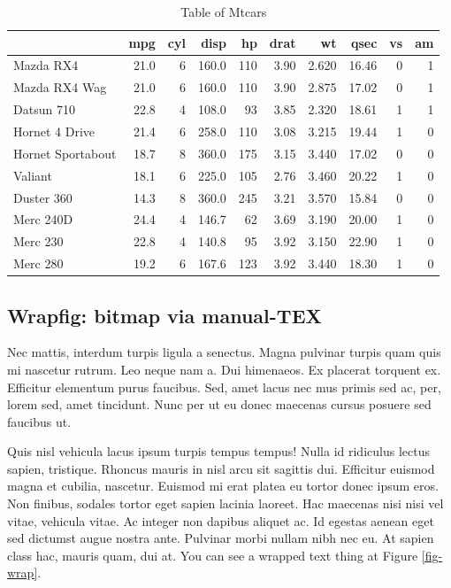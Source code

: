 \documentclass[
  9pt,
  letterpaper,
  DIV=11,
  numbers=noendperiod]{scrartcl}
\begin{document}
\hypertarget{tbl-mtcars2}{}
\begin{table}
\caption{\label{tbl-mtcars2}Table of Mtcars }\tabularnewline

\centering\begingroup\fontsize{7}{9}\selectfont

\begin{tabular}{l|r|r|r|r|r|r|r|r|r}
\hline
  & mpg & cyl & disp & hp & drat & wt & qsec & vs & am\\
\hline
Mazda RX4 & 21.0 & 6 & 160.0 & 110 & 3.90 & 2.620 & 16.46 & 0 & 1\\
\hline
Mazda RX4 Wag & 21.0 & 6 & 160.0 & 110 & 3.90 & 2.875 & 17.02 & 0 & 1\\
\hline
Datsun 710 & 22.8 & 4 & 108.0 & 93 & 3.85 & 2.320 & 18.61 & 1 & 1\\
\hline
Hornet 4 Drive & 21.4 & 6 & 258.0 & 110 & 3.08 & 3.215 & 19.44 & 1 & 0\\
\hline
Hornet Sportabout & 18.7 & 8 & 360.0 & 175 & 3.15 & 3.440 & 17.02 & 0 & 0\\
\hline
Valiant & 18.1 & 6 & 225.0 & 105 & 2.76 & 3.460 & 20.22 & 1 & 0\\
\hline
Duster 360 & 14.3 & 8 & 360.0 & 245 & 3.21 & 3.570 & 15.84 & 0 & 0\\
\hline
Merc 240D & 24.4 & 4 & 146.7 & 62 & 3.69 & 3.190 & 20.00 & 1 & 0\\
\hline
Merc 230 & 22.8 & 4 & 140.8 & 95 & 3.92 & 3.150 & 22.90 & 1 & 0\\
\hline
Merc 280 & 19.2 & 6 & 167.6 & 123 & 3.92 & 3.440 & 18.30 & 1 & 0\\
\hline
\end{tabular}
\endgroup{}
\end{table}

\newpage{}

\hypertarget{wrapfig-bitmap-via-manual-tex}{%
\subsection{Wrapfig: bitmap via
manual-TEX}\label{wrapfig-bitmap-via-manual-tex}}

Nec mattis, interdum turpis ligula a senectus. Magna pulvinar turpis
quam quis mi nascetur rutrum. Leo neque nam a. Dui himenaeos. Ex
placerat torquent ex. Efficitur elementum purus faucibus. Sed, amet
lacus nec mus primis sed ac, per, lorem sed, amet tincidunt. Nunc per ut
eu donec maecenas cursus posuere sed faucibus ut.

Quis nisl vehicula lacus ipsum turpis tempus tempus! Nulla id ridiculus
lectus sapien, tristique. Rhoncus mauris in nisl arcu sit sagittis dui.
Efficitur euismod magna et cubilia, nascetur. Euismod mi erat platea eu
tortor donec ipsum eros. Non finibus, sodales tortor eget sapien lacinia
laoreet. Hac maecenas nisi nisi vel vitae, vehicula vitae. Ac integer
non dapibus aliquet ac. Id egestas aenean eget sed dictumst augue nostra
ante. Pulvinar morbi nullam nibh nec eu. At sapien class hac, mauris
quam, dui at. You can see a wrapped text thing at Figure \ref{fig-wrap}.
\end{document}
